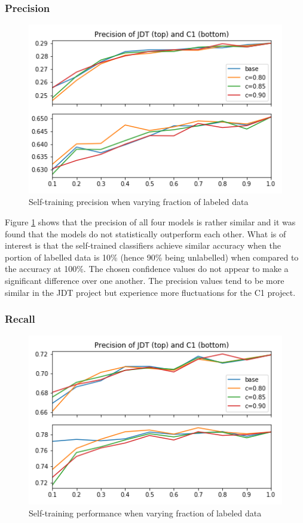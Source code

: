 \documentclass[../main.tex]{subfiles}
\begin{document}
\subsubsection{Precision}

\begin{figure}[H]
    \centering
    \includegraphics[scale=0.8]{images/Results/RQ1/rq1exp2_Precision.png}
    \caption{Self-training precision when varying fraction of labeled data}
    \label{fig:rq2exp2precision}
\end{figure}

Figure \ref{fig:rq2exp2precision} shows that the precision of all four models is rather similar and it was found that the models do not statistically outperform each other. What is of interest is that the self-trained classifiers achieve similar accuracy when the portion of labelled data is 10\% (hence 90\% being unlabelled) when compared to the accuracy at 100\%. The chosen confidence values do not appear to make a significant difference over one another. The precision values tend to be more similar in the JDT project but experience more fluctuations for the C1 project.

\subsubsection{Recall}

\begin{figure}[H]
    \centering
    \includegraphics[scale=0.8]{images/Results/RQ1/rq1exp2_Recall.png}
    \caption{Self-training performance when varying fraction of labeled data}
    \label{fig:rq2exp2recall}
\end{figure}
\end{document}
